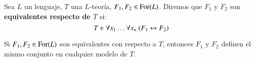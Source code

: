 
\begin{dfn}
    Sea $L$ un lenguaje, $T$ una $L$-teoría, $F_1, F_2 \in \mathrm{For}(L)$. Diremos que $F_1$ y $F_2$ son \textbf{equivalentes respecto de $T$} si:
    $$
        T \vDash \forall x_1 \ldots \forall x_n\ (F_1 \leftrightarrow F_2)
    $$
\end{dfn}


\begin{obs}
    Si $F_1, F_2 \in \mathrm{For}(L)$ son equivalentes con respecto a $T$, entonces $F_1$ y $F_2$ definen el mismo conjunto en cualquier modelo de $T$.
\end{obs}
